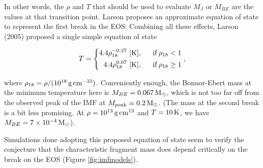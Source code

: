 \documentclass[a4paper,10pt]{article}
\begin{document}
{\noindent}In other words, the $\rho$ and $T$ that should be used to evaluate $M_J$ or $M_{BE}$ are the values at that transition point. Larson proposes an approximate equation of state to represent the first break in the EOS: Combining all these effects, Larson (2005) proposed a single simple equation of state

\begin{equation*}
T =
\left\{
\begin{aligned}
4.4\rho_{18}^{-0.27} ~ [{\rm K}], ~~~~~& \mathrm{if}\,\rho_{18}<1 \\
4.4\rho_{18}^{0.07} ~ [{\rm K}], ~~~~~& \mathrm{if}\,\rho_{18}\geq1
\end{aligned}
\right.
,
\end{equation*}

{\noindent}where $\rho_{18}=\rho/(10^{18}\,{\rm g\,cm^{-33}})$. Conveniently enough, the Bonnor-Ebert mass at the minimum temperature here is $M_{BE}=0.067\,{\rm M_\odot}$, which is not too far off from the observed peak of the IMF at $M_\mathrm{peak}=0.2\,{\rm M_\odot}$. (The mass at the second break is a bit less promising. At $\rho=10^{13}\,{\rm g\,cm^{13}}$ and $T=10\,{\rm K}$, we have $M_{BE}=7\times10^{-4}\,{\rm M_\odot}$).

{\noindent}Simulations done adopting this proposed equation of state seem to verify the conjecture that the characteristic fragment mass does depend critically on the break on the EOS (Figure \ref{fig:imfmodels}).
\end{document}
